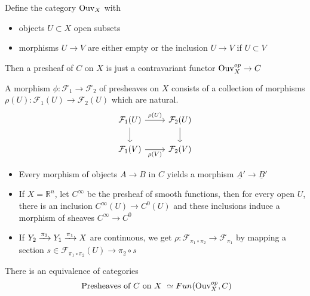 \documentclass[../main.tex]{subfiles}
\begin{document}
\begin{rmq}
Define the category $\operatorname{Ouv}_X $ with
\begin{itemize}
\item objects $U \subset X$ open subsets
\item morphisms $U \to V$ are either empty or the inclusion $U \to V$ if $U \subset V$ 
\end{itemize}
Then a presheaf of $C$ on $X$ is just a contravariant functor $ \operatorname{Ouv}_X^{op}\to C$ 
\end{rmq}
\begin{defn}
	A morphism $\phi: \mathcal{F}_1 \to \mathcal{F}_2$ of presheaves on $X$ consists of a collection of morphisms $\rho( U) : \mathcal{F}_1( U) \to \mathcal{F}_2( U) $ which are natural.
\[\begin{tikzcd}
	{\mathcal{F}_1(U)} & {\mathcal{F}_2(U)} \\
	{\mathcal{F}_1(V)} & {\mathcal{F}_2(V)}
	\arrow[from=1-1, to=2-1]
	\arrow[from=1-2, to=2-2]
	\arrow["{\rho(U)}", from=1-1, to=1-2]
	\arrow["{\rho(V)}"', from=2-1, to=2-2]
\end{tikzcd}\]
\end{defn}
\begin{exemple}
\begin{itemize}
	\item Every morphism of objects $A \to B$ in $C$ yields a morphism $ \underline{A}' \to \underline{B}'$ 
	\item If $X = \mathbb{R}^{n}$, let $C^{ \infty }$ be the presheaf of smooth functions, then for every open $U$, there is an inclusion $C^{ \infty }( U) \to C^{0}( U) $ and these inclusions induce a morphism of sheaves $C^{ \infty }\to C^{0}$ 

	\item If $Y_2\xrightarrow{\pi_2}  Y_1 \xrightarrow{\pi_1} X$ are continuous, we get $\rho: \mathcal{F}_{\pi_1\circ\pi_2} \to \mathcal{F}_{\pi_1} $ by mapping a section $s \in \mathcal{F}_{\pi_1\circ\pi_2} ( U) \to \pi_2\circ s$ 
\end{itemize}
\end{exemple}
\begin{rmq}
There is an equivalence of categories 
\[ 
\text{ Presheaves of $C$ on $X$  }  \simeq Fun( \operatorname{Ouv}_X^{op},C) 
\]
\end{rmq}
\end{document}

